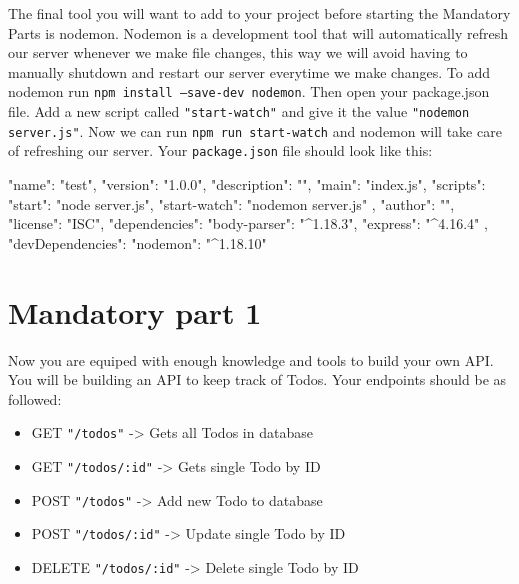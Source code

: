 \documentclass{42-en}
\begin{document}
The final tool you will want to add to your project before starting the Mandatory Parts is nodemon. Nodemon is a development tool that will automatically refresh our server whenever we make file changes, this way we will avoid having to manually shutdown and restart our server everytime we make changes. To add nodemon run \texttt{npm install --save-dev nodemon}. Then open your package.json file. Add a new script called \texttt{"start-watch"} and give it the value \texttt{"nodemon server.js"}. Now we can run \texttt{npm run start-watch} and nodemon will take care of refreshing our server. Your \texttt{package.json} file should look like this:
\begin{42jscode}
{
  "name": "test",
  "version": "1.0.0",
  "description": "",
  "main": "index.js",
  "scripts": {
    "start": "node server.js",
    "start-watch": "nodemon server.js"
  },
  "author": "",
  "license": "ISC",
  "dependencies": {
    "body-parser": "^1.18.3",
    "express": "^4.16.4"
  },
  "devDependencies": {
    "nodemon": "^1.18.10"
  }
}
\end{42jscode}


\newpage
\nextexercice

\chapter{Mandatory part 1}

Now you are equiped with enough knowledge and tools to build your own API. You will be building an API to keep track of Todos. Your endpoints should be as followed:

\begin{itemize}\itemsep1pt
\item GET \texttt{"/todos"} -> Gets all Todos in database
\item GET \texttt{"/todos/:id"} -> Gets single Todo by ID
\item POST \texttt{"/todos"} -> Add new Todo to database
\item POST \texttt{"/todos/:id"} -> Update single Todo by ID
\item DELETE \texttt{"/todos/:id"} -> Delete single Todo by ID
\end{itemize}
\end{document}
